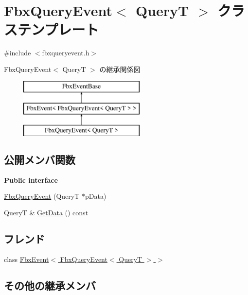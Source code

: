 \hypertarget{class_fbx_query_event}{}\section{Fbx\+Query\+Event$<$ QueryT $>$ クラステンプレート}
\label{class_fbx_query_event}


{\ttfamily \#include $<$fbxqueryevent.\+h$>$}

Fbx\+Query\+Event$<$ QueryT $>$ の継承関係図\begin{figure}[H]
\begin{center}
\leavevmode
\includegraphics[height=3.000000cm]{class_fbx_query_event}
\end{center}
\end{figure}
\subsection*{公開メンバ関数}
\begin{Indent}\textbf{ Public interface}\par
\begin{DoxyCompactItemize}
\item 
\hyperlink{class_fbx_query_event_ac0f4e691d9190901d1b55cea64653055}{Fbx\+Query\+Event} (QueryT $\ast$p\+Data)
\item 
QueryT \& \hyperlink{class_fbx_query_event_aff8c93540fbd84ec48c8fed06593e4b4}{Get\+Data} () const
\end{DoxyCompactItemize}
\end{Indent}
\subsection*{フレンド}
\begin{DoxyCompactItemize}
\item 
class \hyperlink{class_fbx_query_event_ade3703dd283c116fbf29343f18ed9daa}{Fbx\+Event$<$ Fbx\+Query\+Event$<$ Query\+T $>$ $>$}
\end{DoxyCompactItemize}
\subsection*{その他の継承メンバ}


